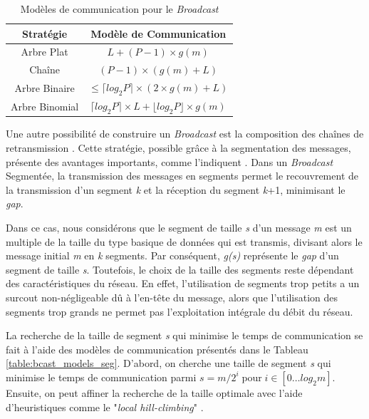 %
\begin{table}
	\centering
	\begin{tabular}{|c|c|}
		\hline 
		\textbf{\small Stratégie} & \textbf{\small Modèle de Communication}\tabularnewline
		\hline
		\hline 
		{\small Arbre Plat} & {\small $L+(P-1)\times g(m)$}\tabularnewline
		\hline 
		{\small Chaîne} & {\small $(P-1)\times(g(m)+L)$}\tabularnewline
		\hline 
		{\small Arbre Binaire} & {\small $\leq\lceil log_{2}P\rceil\times(2\times g(m)+L)$}\tabularnewline
		\hline 
		{\small Arbre Binomial} & {\small $\lceil log_{2}P\rceil\times L+\lfloor log_{2}P\rfloor\times g(m)$}\tabularnewline
		\hline
	\end{tabular}
	
	
	\caption{\label{table:bcast_models_classique}Modèles de communication pour
		le \emph{Broadcast}}
	
\end{table}


Une autre possibilité de construire un \emph{Broadcast} est la composition
des chaînes de retransmission \cite{Barnett96}. Cette stratégie,
possible grâce à la segmentation des messages, présente des avantages
importants, comme l'indiquent \cite{Kielmann01}\cite{Thakur03}\cite{Beaumont04a}.
Dans un \emph{Broadcast} Segmentée, la transmission des messages en
segments permet le recouvrement de la transmission d'un segment \emph{k}
et la réception du segment \emph{k}+1, minimisant le \emph{gap}.

Dans ce cas, nous considérons que le segment de taille \emph{s} d'un
message \emph{m} est un multiple de la taille du type basique de données
qui est transmis, divisant alors le message initial \emph{m} en \emph{k}
segments. Par conséquent, \emph{g(s)} représente le \emph{gap} d'un
segment de taille \emph{s}. Toutefois, le choix de la taille des segments
reste dépendant des caractéristiques du réseau. En effet, l'utilisation
de segments trop petits a un surcout non-négligeable dû à l'en-tête
du message, alors que l'utilisation des segments trop grands ne permet
pas l'exploitation intégrale du débit du réseau. 

La recherche de la taille de segment \emph{s} qui minimise le temps
de communication se fait à l'aide des modèles de communication présentés
dans le Tableau \ref{table:bcast_models_seg}. D'abord, on cherche
une taille de segment \emph{s} qui minimise le temps de communication
parmi $s=m/2^{i}\;\mathrm{pour}\; i\in[0\ldots log_{2}m]$. Ensuite,
on peut affiner la recherche de la taille optimale avec l'aide d'heuristiques
comme le "\textit{local hill-climbing}" \cite{Kielmann01}.

